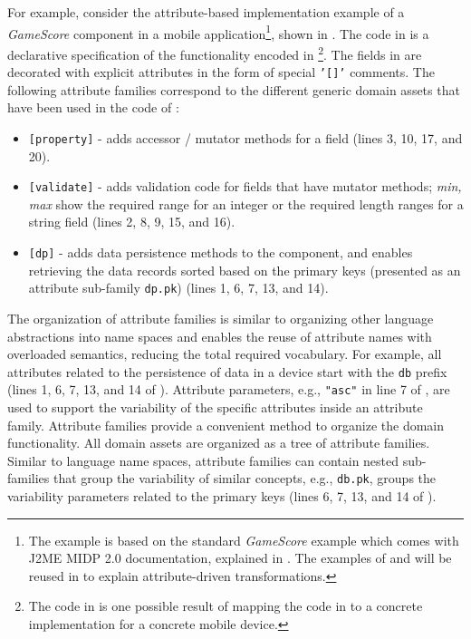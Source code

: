 For example, consider the attribute-based implementation example of a \textit{GameScore} component in a mobile application\footnote{The example is based on the standard \textit{GameScore} example which comes with J2ME MIDP 2.0 \cite{www.midp-ota} documentation, explained in . The examples of   and   will be reused in  to explain attribute-driven transformations.}, shown in . The code in  is a declarative specification of the functionality encoded in \footnote{The code in  is one possible result of mapping the code in  to a concrete implementation for a concrete mobile device.}. The fields in  are decorated with explicit attributes in the form of special \texttt{'[]'} comments. The following attribute families correspond to the different generic domain assets  that have been used in the code of :
\begin{itemize}
\item \texttt{[property]} - adds accessor / mutator methods for a field (lines 3, 10, 17, and 20).
\item \texttt{[validate]} - adds validation code for fields that have mutator methods; \textit{min, max} show the required range for an integer or the required length ranges for a string field (lines 2, 8, 9, 15, and 16).
\item \texttt{[dp]} - adds data persistence methods to the component, and enables retrieving the data records sorted based on the primary keys (presented as an attribute sub-family \texttt{dp.pk}) (lines 1, 6, 7, 13, and 14).
\end{itemize}

The organization of attribute families is similar to organizing other language abstractions into name spaces and enables the reuse of attribute names with overloaded semantics, reducing the total required vocabulary. For example, all attributes related to the persistence of data in a device start with the \texttt{db} prefix (lines 1, 6, 7, 13, and 14 of ). Attribute parameters, e.g., \texttt{"asc"} in line 7 of , are used to support the variability of the specific attributes inside an attribute family. Attribute families provide a convenient method to organize the domain functionality. All domain assets are organized as a tree of attribute families. Similar to language name spaces, attribute families can contain nested sub-families that group the variability of similar concepts, e.g., \texttt{db.pk}, groups the variability parameters related to the primary keys (lines 6, 7, 13, and 14 of ).

